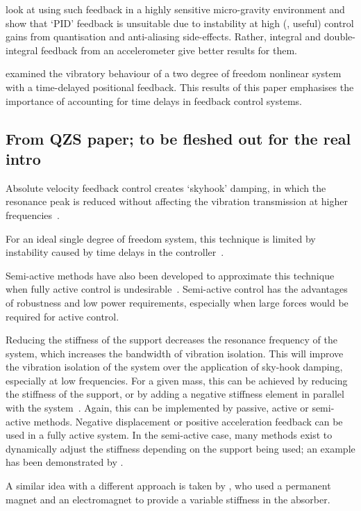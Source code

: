 \textcite{zhu2006} look at using such feedback in a highly sensitive
micro-gravity environment and show that `PID' feedback is unsuitable due to
instability at high (\ie, useful) control gains from quantisation and
anti-aliasing side-effects. Rather, integral and double-integral feedback from
an accelerometer give better results for them.

\textcite{zhao2007} examined the vibratory behaviour of a two degree of
freedom nonlinear system with a time-delayed positional feedback. This results
of this paper emphasises the importance of accounting for time delays in
feedback control systems.

\subsection{From QZS paper; to be fleshed out for the real intro}

Absolute velocity feedback control creates `skyhook' damping, in which
the resonance peak is reduced without affecting the vibration
transmission at higher frequencies~\cite{yan2006}. 

For an ideal single degree of freedom system, this technique is limited by
instability caused by time delays in the
controller~\cite{ananthaganeshan2001,elliott2004,brennan2007}.

Semi-active methods have also been developed to approximate this
technique when fully active control is
undesirable~\cite{liu2002,liu2005,ahmadian2004}. Semi-active control
has the advantages of robustness and low power requirements,
especially when large forces would be required for active control.

Reducing the stiffness of the support decreases the resonance
frequency of the system, which increases the bandwidth of vibration
isolation. This will improve the vibration isolation of the system
over the application of sky-hook damping, especially at low
frequencies.  For a given mass, this can be achieved by reducing the
stiffness of the support, or by adding a negative stiffness element in
parallel with the system~\cite{lee2007,xing2005}. Again, this can be
implemented by passive, active or semi-active methods. Negative
displacement or positive acceleration feedback can be used in a fully
active system. In the semi-active case, many methods exist to
dynamically adjust the stiffness depending on the support being used;
an example has been demonstrated by \textcite{kidner2002}.

A similar idea with a different approach is taken by
\textcite{liu2006a}, who used a permanent magnet and an electromagnet
to provide a variable stiffness in the absorber.

